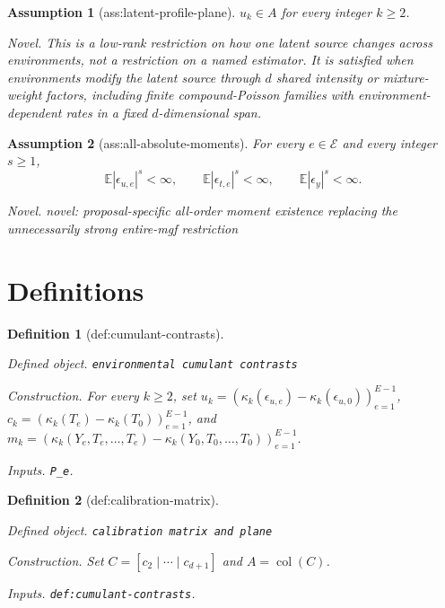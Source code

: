 \documentclass{article}
\newtheorem{assumption}{Assumption}
\newtheorem{definition}{Definition}
\begin{document}
\begin{assumption}[ass:latent-profile-plane]\label{ass:latent-profile-plane}
\(u_k\in A\) for every integer \(k\ge2\).
\par\smallskip\noindent\emph{Novel.} This is a low-rank restriction on how one latent source changes across environments, not a restriction on a named estimator.  It is satisfied when environments modify the latent source through \(d\) shared intensity or mixture-weight factors, including finite compound-Poisson families with environment-dependent rates in a fixed \(d\)-dimensional span.
\end{assumption}

\begin{assumption}[ass:all-absolute-moments]\label{ass:all-absolute-moments}
For every \(e\in\mathcal E\) and every integer \(s\geq1\),
\[
 \mathbb E|\epsilon_{u,e}|^s<\infty,
 \qquad
 \mathbb E|\epsilon_{t,e}|^s<\infty,
 \qquad
 \mathbb E|\epsilon_y|^s<\infty.
\]
\par\smallskip\noindent\emph{Novel.} novel: proposal-specific all-order moment existence replacing the unnecessarily strong entire-mgf restriction
\end{assumption}

\section{Definitions}

\begin{definition}[def:cumulant-contrasts]\label{def:cumulant-contrasts}
\par\smallskip\noindent\emph{Defined object.} \texttt{environmental cumulant contrasts}
\par\smallskip\noindent\emph{Construction.} For every \(k\ge2\), set \(u_k=(\kappa_k(\epsilon_{u,e})-\kappa_k(\epsilon_{u,0}))_{e=1}^{E-1}\), \(c_k=(\kappa_k(T_e)-\kappa_k(T_0))_{e=1}^{E-1}\), and \(m_k=(\kappa_k(Y_e,T_e,\ldots,T_e)-\kappa_k(Y_0,T_0,\ldots,T_0))_{e=1}^{E-1}\).
\par\smallskip\noindent\emph{Inputs.} \texttt{P\_\allowbreak{}e}.
\end{definition}

\begin{definition}[def:calibration-matrix]\label{def:calibration-matrix}
\par\smallskip\noindent\emph{Defined object.} \texttt{calibration matrix and plane}
\par\smallskip\noindent\emph{Construction.} Set \(C=[c_2\mid\cdots\mid c_{d+1}]\) and \(A=\operatorname{col}(C)\).
\par\smallskip\noindent\emph{Inputs.} \texttt{def:\allowbreak{}cumulant-\allowbreak{}contrasts}.
\end{definition}
\end{document}
